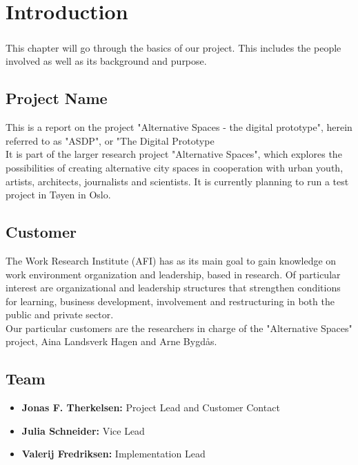 \chapter{Introduction}

\paragraph{} This chapter will go through the basics of our project. This includes the people involved as well as its background and purpose.

\section{Project Name} 
This is a report on the project "Alternative Spaces - the digital prototype", herein referred to as "ASDP", or "The Digital Prototype\\
\indent It is part of the larger research project "Alternative Spaces", which explores the possibilities of creating alternative city spaces in cooperation with urban youth, artists, architects, journalists and scientists. It is currently planning to run a test project in T\o yen in Oslo.

\section{Customer}
The Work Research Institute (AFI) has as its main goal to gain knowledge on work environment organization and leadership, based in research. Of particular interest are organizational and leadership structures that strengthen conditions for learning, business development, involvement and restructuring in both the public and private sector.\\
\indent Our particular customers are the researchers in charge of the "Alternative Spaces" project, Aina Landsverk Hagen and Arne Bygd\aa s.

\section{Team}
\begin{itemize}
\item \textbf{Jonas F. Therkelsen:} Project Lead and Customer Contact
\item \textbf{Julia Schneider:} Vice Lead
\item \textbf{Valerij Fredriksen:} Implementation Lead
\end{itemize}

